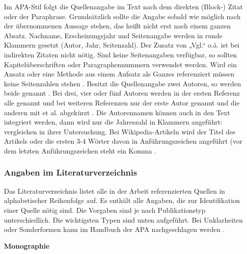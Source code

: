 Im APA-Stil folgt die Quellenangabe im Text nach dem direkten (Block-) Zitat oder der Paraphrase. Grundsätzlich sollte die Angabe sobald wie möglich nach der übernommenen Aussage stehen, das heißt nicht erst nach einem ganzen Absatz. Nachname, Erscheinungsjahr und Seitenangabe werden in runde Klammern gesetzt (Autor, Jahr, Seitenzahl). Der Zusatz von „Vgl.“ o.ä. ist bei indirekten Zitaten nicht nötig. Sind keine Seitenangaben verfügbar, so sollten Kapitelüberschriften oder Paragraphennummern verwendet werden. Wird ein Ansatz oder eine Methode aus einem Aufsatz als Ganzes referenziert müssen keine Seitenzahlen stehen \cite[]{mustermann2013test}. Besitzt die Quellenangabe zwei Autoren, so werden beide genannt \cite[]{mustermann2015gemeinsam}. Bei drei, vier oder fünf Autoren werden in der ersten Referenz alle genannt \cite*[]{mustermann2017viele} und bei weiteren Referenzen nur der erste Autor genannt und die anderen mit et al. abgekürzt \cite[]{mustermann2017viele}. Die Autorennamen können auch in den Text integriert werden, dann wird nur die Jahreszahl in Klammern angeführt: \citet{mustermann2013test} vergleichen in ihrer Untersuchung. Bei Wikipedia-Artikeln wird der Titel des Artikels oder die ersten 3-4 Wörter davon in Anführungszeichen angeführt (vor dem letzten Anführungszeichen steht ein Komma \cite[]{noauthor_wissenschaft_2020}.

\subsubsection{Angaben im Literaturverzeichnis}\label{subsubsec:angaben}

Das Literaturverzeichnis listet alle in der Arbeit referenzierten Quellen in alphabetischer Reihenfolge auf. Es enthält alle Angaben, die zur Identifikation einer Quelle nötig sind. Die Vorgaben sind je nach Publikationstyp unterschiedlich. Die wichtigsten Typen sind unten aufgeführt. Bei Unklarheiten oder Sonderformen kann im Handbuch der APA nachgeschlagen werden \cite[]{american2010concise}.

\bigskip
\textbf{Monographie}

\makeatletter 
\renewcommand\BR@b@bibitem[2][]{\BR@bibitem[#1]{#2}\BR@c@bibitem{#2}}           
\makeatother

\nobibliography*%


